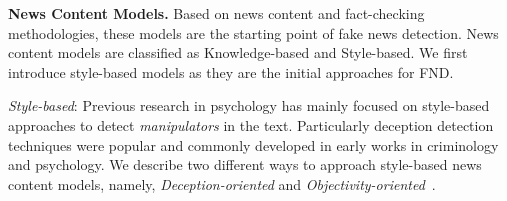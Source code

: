 \textbf{News Content Models.} Based on news content and fact-checking methodologies, these models are the starting point of fake news detection. News content models are classified as Knowledge-based and Style-based. We first introduce style-based models as they are the initial approaches for FND.
\begin{description}
    \item{\emph{Style-based}:} Previous research in psychology has mainly focused on style-based approaches to detect \emph{manipulators} in the text. Particularly deception detection techniques were popular and commonly developed in early works in criminology and psychology. We describe two different ways to approach style-based news content models, namely, \emph{Deception-oriented} and \emph{Objectivity-oriented}~\parencite{FakeNewsDetectionOnSocialMediaADataMiningPerspective_Shu}.
    \begin{itemize}

\end{itemize}
\end{description}

